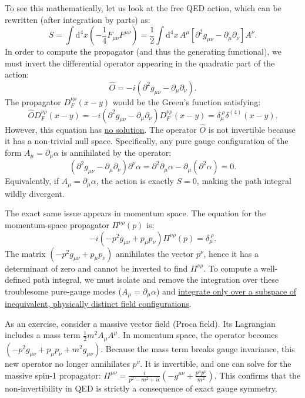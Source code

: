 To see this mathematically, let us look at the free QED action, which can be rewritten (after integration by parts) as:
\[
    S = \int \mathrm{d}^4x \left( -\frac{1}{4} F_{\mu\nu} F^{\mu\nu} \right) = \frac{1}{2} \int \mathrm{d}^4x \, A^\mu \left[ \partial^2 g_{\mu\nu} - \partial_\mu \partial_\nu \right] A^\nu.
\]
In order to compute the propagator (and thus the generating functional), we must invert the differential operator appearing in the quadratic part of the action:
\[
    \hat{O} = -i (\partial^2 g_{\mu\nu} - \partial_\mu \partial_\nu).
\]
The propagator $D_F^{\nu\rho}(x-y)$ would be the Green's function satisfying:
\[
    \hat{O} D_F^{\nu\rho}(x-y) = -i (\partial^2 g_{\mu\nu} - \partial_\mu \partial_\nu) D_F^{\nu\rho}(x-y) = \delta_\mu^{\ \rho} \delta^{(4)}(x-y).
\]
However, this equation has \uline{no solution}. The operator $\hat{O}$ is not invertible because it has a non-trivial null space. Specifically, any pure gauge configuration of the form $A_\mu = \partial_\mu \alpha$ is annihilated by the operator:
\[
    (\partial^2 g_{\mu\nu} - \partial_\mu \partial_\nu) \partial^\nu \alpha = \partial^2 \partial_\mu \alpha - \partial_\mu (\partial^2 \alpha) = 0.
\]
Equivalently, if $A_\mu = \partial_\mu \alpha$, the action is exactly $S=0$, making the path integral wildly divergent.

The exact same issue appears in momentum space. The equation for the momentum-space propagator $\Pi^{\nu\rho}(p)$ is:
\[
    -i (-p^2 g_{\mu\nu} + p_\mu p_\nu) \Pi^{\nu\rho}(p) = \delta_\mu^{\ \rho}.
\]
The matrix $(-p^2 g_{\mu\nu} + p_\mu p_\nu)$ annihilates the vector $p^\nu$, hence it has a determinant of zero and cannot be inverted to find $\Pi^{\nu\rho}$.
To compute a well-defined path integral, we must isolate and remove the integration over these troublesome pure-gauge modes ($A_\mu = \partial_\mu \alpha$) and \uline{integrate only over a subspace of inequivalent, physically distinct field configurations}.

\begin{example}
    As an exercise, consider a massive vector field (Proca field). Its Lagrangian includes a mass term $\frac{1}{2}m^2 A_\mu A^\mu$. In momentum space, the operator becomes $(-p^2 g_{\mu\nu} + p_\mu p_\nu + m^2 g_{\mu\nu})$. Because the mass term breaks gauge invariance, this new operator no longer annihilates $p^\nu$. It is invertible, and one can solve for the massive spin-1 propagator: $\Pi^{\mu\nu} = \frac{i}{p^2 - m^2 + i\epsilon} (-g^{\mu\nu} + \frac{p^\mu p^\nu}{m^2})$. This confirms that the non-invertibility in QED is strictly a consequence of exact gauge symmetry.
\end{example}

